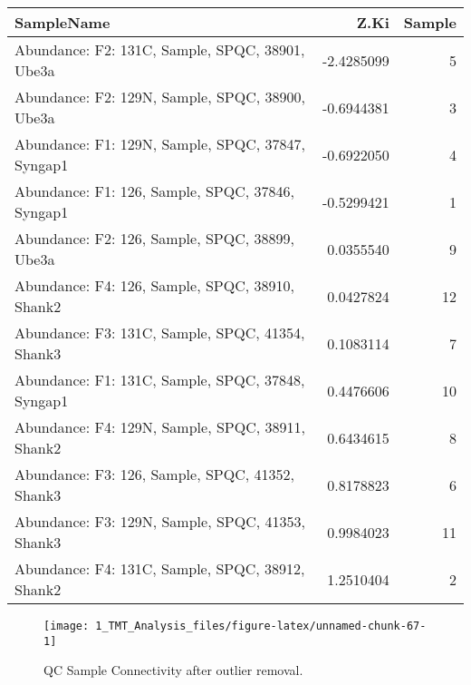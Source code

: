 \documentclass[]{article}
\newenvironment{Shaded}{\begin{snugshade}}{\end{snugshade}}
\newcommand{\KeywordTok}[1]{\textcolor[rgb]{0.13,0.29,0.53}{\textbf{#1}}}
\newcommand{\DataTypeTok}[1]{\textcolor[rgb]{0.13,0.29,0.53}{#1}}
\newcommand{\StringTok}[1]{\textcolor[rgb]{0.31,0.60,0.02}{#1}}
\newcommand{\CommentTok}[1]{\textcolor[rgb]{0.56,0.35,0.01}{\textit{#1}}}
\newcommand{\OtherTok}[1]{\textcolor[rgb]{0.56,0.35,0.01}{#1}}
\newcommand{\OperatorTok}[1]{\textcolor[rgb]{0.81,0.36,0.00}{\textbf{#1}}}
\newcommand{\NormalTok}[1]{#1}
\begin{document}
\begin{longtable}[]{@{}lrr@{}}
\toprule
SampleName & Z.Ki & Sample\tabularnewline
\midrule
\endhead
Abundance: F2: 131C, Sample, SPQC, 38901, Ube3a & -2.4285099 &
5\tabularnewline
Abundance: F2: 129N, Sample, SPQC, 38900, Ube3a & -0.6944381 &
3\tabularnewline
Abundance: F1: 129N, Sample, SPQC, 37847, Syngap1 & -0.6922050 &
4\tabularnewline
Abundance: F1: 126, Sample, SPQC, 37846, Syngap1 & -0.5299421 &
1\tabularnewline
Abundance: F2: 126, Sample, SPQC, 38899, Ube3a & 0.0355540 &
9\tabularnewline
Abundance: F4: 126, Sample, SPQC, 38910, Shank2 & 0.0427824 &
12\tabularnewline
Abundance: F3: 131C, Sample, SPQC, 41354, Shank3 & 0.1083114 &
7\tabularnewline
Abundance: F1: 131C, Sample, SPQC, 37848, Syngap1 & 0.4476606 &
10\tabularnewline
Abundance: F4: 129N, Sample, SPQC, 38911, Shank2 & 0.6434615 &
8\tabularnewline
Abundance: F3: 126, Sample, SPQC, 41352, Shank3 & 0.8178823 &
6\tabularnewline
Abundance: F3: 129N, Sample, SPQC, 41353, Shank3 & 0.9984023 &
11\tabularnewline
Abundance: F4: 131C, Sample, SPQC, 38912, Shank2 & 1.2510404 &
2\tabularnewline
\bottomrule
\end{longtable}

\begin{Shaded}
\end{Shaded}

\begin{figure}

{\centering \texttt{[image: 1\_TMT\_Analysis\_files/figure-latex/unnamed-chunk-67-1]} 

}

\caption{QC Sample Connectivity after outlier removal.}\label{fig:unnamed-chunk-67}
\end{figure}
\end{document}
